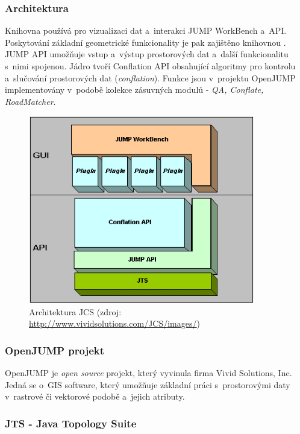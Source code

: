 \subsubsection{Architektura}

Knihovna  používá pro vizualizaci dat a~interakci JUMP WorkBench
a~API. Poskytování základní geometrické funkcionality je pak zajištěno 
knihovnou . JUMP API umožňuje vstup a~výstup prostorových dat 
a~další funkcionalitu s~nimi spojenou. Jádro  tvoří Conflation API
obsahující algoritmy pro kontrolu a~slučo\-vání prostorových dat 
(\textit{conflation}). Funkce  jsou v~projektu OpenJUMP 
implementovány v~podobě kolekce zásuvných modulů - \textit{QA, Conflate, 
RoadMatcher}.

  \begin{figure}[H]
    \centering
      \includegraphics[width=280pt]{./pictures/JCS_Architecture.png}
      \caption[Architektura JCS]{Architektura JCS 
	  (zdroj: \url{http://www.vividsolutions.com/JCS/images/})}
      \label{fig:architektura}
  \end{figure}


\subsubsection{OpenJUMP projekt}

OpenJUMP je \textit{open source} projekt, který vyvinula firma Vivid Solutions,
Inc. Jedná se o~GIS software, který umožňuje základní práci 
s~prostorovými daty v~rastrové či vektorové podobě a~jejich atributy.

\subsubsection{JTS - Java Topology Suite}
\label{jts}

